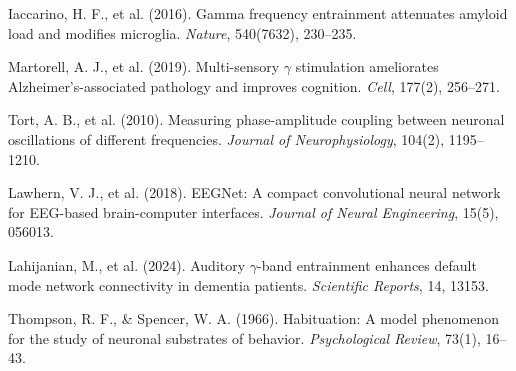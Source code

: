 \documentclass[11pt,letterpaper]{article}
\begin{document}
\begin{description}[leftmargin=2em, labelindent=0pt, noitemsep]
  \item Iaccarino, H. F., et al. (2016). Gamma frequency entrainment attenuates amyloid load
        and modifies microglia. \textit{Nature}, 540(7632), 230--235.

  \item Martorell, A. J., et al. (2019). Multi-sensory $\gamma$ stimulation ameliorates
        Alzheimer's-associated pathology and improves cognition. \textit{Cell}, 177(2),
        256--271.

  \item Tort, A. B., et al. (2010). Measuring phase-amplitude coupling between neuronal
        oscillations of different frequencies. \textit{Journal of Neurophysiology}, 104(2),
        1195--1210.

  \item Lawhern, V. J., et al. (2018). EEGNet: A compact convolutional neural network for
        EEG-based brain-computer interfaces. \textit{Journal of Neural Engineering}, 15(5),
        056013.

  \item Lahijanian, M., et al. (2024). Auditory $\gamma$-band entrainment enhances default mode
        network connectivity in dementia patients. \textit{Scientific Reports}, 14, 13153.

  \item Thompson, R. F., \& Spencer, W. A. (1966). Habituation: A model phenomenon for the
        study of neuronal substrates of behavior. \textit{Psychological Review}, 73(1), 16--43.
\end{description}
\end{document}
